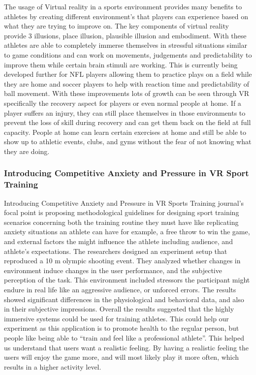 \documentclass{sigchi}
\begin{document}
The usage of Virtual reality in a sports environment provides many benefits to athletes by creating different environment’s that players can experience based on what they are trying to improve on.  The key components of virtual reality provide 3 illusions, place illusion, plausible illusion and embodiment. With these athletes are able to completely immerse themselves in stressful situations similar to game conditions and can work on movements, judgements and predictability to improve them while certain brain stimuli are working. This is currently being developed further for NFL players allowing them to practice plays on a field while they are home and soccer players to help with reaction time and predictability of ball movement. 
With these improvements lots of growth can be seen through VR specifically the recovery aspect for players or even normal people at home. If a player suffers an injury, they can still place themselves in those environments to prevent the loss of skill during recovery and can get them back on the field at full capacity. People at home can learn certain exercises at home and still be able to show up to athletic events, clubs, and gyms without the fear of not knowing what they are doing.\cite{barca_innovation_hub_2019}

\subsubsection{Introducing Competitive Anxiety and Pressure in VR Sport Training}

Introducing Competitive Anxiety and Pressure in VR Sports Training journal’s\cite{wang_2012} focal point is proposing methodological guidelines for designing sport training scenarios concerning both the training routine they must have like replicating anxiety situations an athlete can have for example, a free throw to win the game, and external factors the might influence the athlete including audience, and athlete's expectations. The researchers designed an experiment setup that reproduced a 10 m olympic shooting event. They analyzed whether changes in environment induce changes in the user performance, and the subjective perception of the task. This environment included stressors the participant might endure in real life like an aggressive audience, or unforced errors. The results showed significant differences in the physiological and behavioral data, and also in their subjective impressions. Overall the results suggested that the highly immersive systems could be used for training athletes. This could help our experiment as this application is to promote health to the regular person, but people like being able to “train and feel like a professional athlete”. This helped us understand that users want a realistic feeling. By having a realistic feeling the users will enjoy the game more, and will most likely play it more often, which results in a higher activity level.
\end{document}
